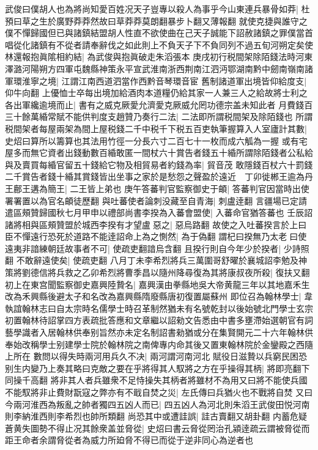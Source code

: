 武俊曰僕胡人也為將尚知愛百姓况天子豈專以殺人為事乎今山東連兵暴骨如莽|{
	杜預曰草之生於廣野莽莽然故曰草莽莽莫朗翻暴步卜翻又薄報翻}
就使克捷與誰守之僕不憚歸國但已與諸鎮結盟胡人性直不欲使曲在己天子誠能下詔赦諸鎮之罪僕當首唱從化諸鎮有不從者請奉辭伐之如此則上不負天子下不負同列不過五旬河朔定矣使林還報抱眞隂相約結|{
	為武俊與抱眞破走朱滔張本}
庚戌初行税間架除陌錢法時河東澤潞河陽朔方四軍屯魏縣神策永平宣武淮南浙西荆南江泗沔鄂湖南黔中劒南嶺南諸軍環淮寧之境|{
	江謂江南西道泗當作西黔音琴環音宦}
舊制諸道軍出境皆仰給度支|{
	仰牛向翻}
上優恤士卒每出境加給酒肉本道糧仍給其家一人兼三人之給故將士利之各出軍纔逾境而止|{
	書有之威克厥愛允濟愛克厥威允罔功德宗盖未知此者}
月費錢百三十餘萬緍常賦不能供判度支趙贊乃奏行二法|{
	二法即所謂税間架及除陌錢也}
所謂税間架者每屋兩架為間上屋税錢二千中税千下税五百吏執筆握算入人室廬計其數|{
	史炤曰算所以籌算也其法用竹徑一分長六寸二百七十一枚而成六觚為一握}
或有宅屋多而無它資者出錢動數百緍敢匿一間杖六十賞告者錢五十緍所謂除陌錢者公私給與及賣買每緍官留五十錢給它物及相貿易者約錢為率|{
	貿音茂}
敢隱錢百杖六十罰錢二千賞告者錢十緍其賞錢皆出坐事之家於是愁怨之聲盈於遠近　丁卯徙郴王逾為丹王鄜王遘為簡王|{
	二王皆上弟也}
庚午答蕃判官監察御史于頔|{
	答蕃判官因當時出使署署置以為官名頔徒歷翻}
與吐蕃使者論刺没藏至自青海|{
	刺盧逹翻}
言疆場已定請遣區頰贊歸國秋七月甲申以禮部尚書李揆為入蕃會盟使|{
	入蕃命官猶答蕃也}
壬辰詔諸將相與區頰贊盟於城西李揆有才望盧惡之|{
	惡烏路翻}
故使之入吐蕃揆言於上曰臣不憚遠行恐死於道路不能逹詔命上為之惻然|{
	為于偽翻}
謂杞曰揆無乃太老曰使遠夷非諳練朝廷故事者不可|{
	使疏吏翻諳烏含翻}
且揆行則自今年少於揆者|{
	少詩照翻}
不敢辭遠使矣|{
	使疏吏翻}
八月丁未李希烈將兵三萬圍哥舒曜於襄城詔李勉及神策將劉德信將兵救之乙卯希烈將曹季昌以隨州降尋復為其將康叔夜所殺|{
	復扶又翻}
初上在東宫聞監察御史嘉興陸贄名|{
	嘉興漢由拳縣地吳大帝黄龍三年以其地嘉禾生改為禾興縣後避太子和名改為嘉興縣隋廢縣唐初復置屬蘇州}
即位召為翰林學士|{
	韋執誼翰林志曰自太宗時名儒學士時召革制然猶未有名號乾封以後始號北門學士玄宗初置翰林待詔掌四方表疏批答應和文章繼以詔勑文告悉由中書多壅滯始選朝官有詞藝學識者入居翰林供奉别旨然亦未定名制詔書勑猶或分在集賢開元二十六年翰林供奉始改稱學士别建學士院於翰林院之南俾專内命其後又置東翰林院於金鑾殿之西隨上所在}
數問以得失時兩河用兵久不决|{
	兩河謂河南河北}
賦役日滋贄以兵窮民困恐别生内變乃上奏其略曰克敵之要在乎將得其人馭將之方在乎操得其柄|{
	將即亮翻下同操千高翻}
將非其人者兵雖衆不足恃操失其柄者將雖材不為用又曰將不能使兵國不能馭將非止費財翫寇之弊亦有不戢自焚之災|{
	左氏傳曰兵猶火也不戰將自焚}
又曰今兩河淮西為叛亂之帥者獨四五凶人而已|{
	四五凶人為河北則朱滔王武俊田悦河南則李納淮西則李希烈也帥所類翻}
尚恐其中或遭詿誤|{
	詿古賣翻又胡卦翻}
内蓄危疑蒼黄失圖勢不得止况其餘衆盖並脅從|{
	史炤曰書云脅從罔治孔潁逹疏云謂被脅從而距王命者余謂脅從者為威力所廹脅不得已而從于逆非同心為逆者也}
